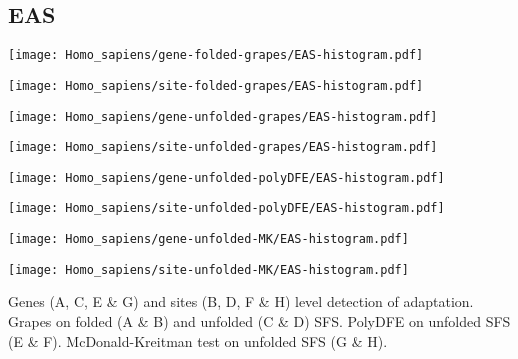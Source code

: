 \documentclass{article}
\begin{document}
\pagebreak
\subsection{EAS}
\centering
\begin{minipage}{0.49\linewidth}
    \texttt{[image: Homo\_sapiens/gene-folded-grapes/EAS-histogram.pdf]}
\end{minipage}%
\hfill
\begin{minipage}{0.49\linewidth}
    \texttt{[image: Homo\_sapiens/site-folded-grapes/EAS-histogram.pdf]}
\end{minipage}
\hfill
\begin{minipage}{0.49\linewidth}
    \texttt{[image: Homo\_sapiens/gene-unfolded-grapes/EAS-histogram.pdf]}
\end{minipage}%
\hfill
\begin{minipage}{0.49\linewidth}
    \texttt{[image: Homo\_sapiens/site-unfolded-grapes/EAS-histogram.pdf]}
\end{minipage}
\hfill
\begin{minipage}{0.49\linewidth}
    \texttt{[image: Homo\_sapiens/gene-unfolded-polyDFE/EAS-histogram.pdf]}
\end{minipage}%
\hfill
\begin{minipage}{0.49\linewidth}
    \texttt{[image: Homo\_sapiens/site-unfolded-polyDFE/EAS-histogram.pdf]}
\end{minipage}
\hfill
\begin{minipage}{0.49\linewidth}
    \texttt{[image: Homo\_sapiens/gene-unfolded-MK/EAS-histogram.pdf]}
\end{minipage}%
\hfill
\begin{minipage}{0.49\linewidth}
    \texttt{[image: Homo\_sapiens/site-unfolded-MK/EAS-histogram.pdf]}
\end{minipage}
\hfill
\flushleft
Genes (A, C, E \& G) and sites (B, D, F \& H) level detection of adaptation.
Grapes on folded (A \& B) and unfolded (C \& D) SFS.
PolyDFE on unfolded SFS (E \& F).
McDonald-Kreitman test on unfolded SFS (G \& H).
\end{document}
